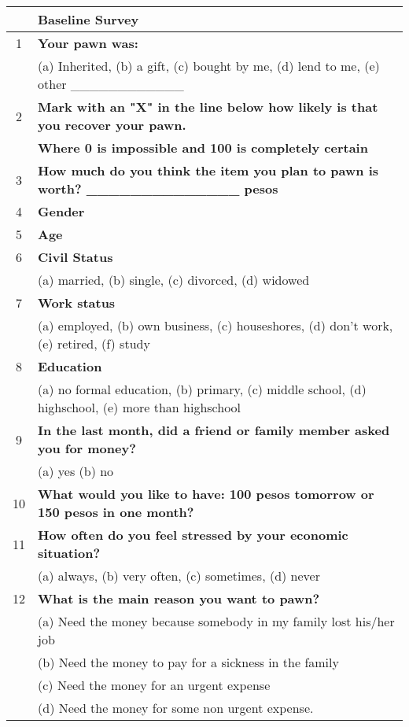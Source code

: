 \begin{tabular}{cl}
\toprule
      & \textbf{Baseline Survey} \\
\midrule
\midrule
1     & \textbf{Your pawn was:} \\
      & (a) Inherited, (b) a gift, (c) bought by me, (d) lend to me, (e) other \_\_\_\_\_\_\_\_\_\_\_\_ \\
2     & \textbf{Mark with an "X" in the line below how likely is that you recover your pawn. } \\
      & \textbf{Where 0 is impossible and 100 is completely certain} \\
3     & \textbf{How much do you think the item you plan to pawn is worth?       \_\_\_\_\_\_\_\_\_\_\_\_\_\_ pesos} \\
4     & \textbf{Gender      } \\
5     & \textbf{Age} \\
6     & \textbf{Civil Status } \\
      & (a) married, (b) single, (c) divorced, (d) widowed \\
7     & \textbf{Work status} \\
      & (a) employed, (b) own business, (c) houseshores, (d) don't work, (e) retired, (f) study \\
8     & \textbf{Education} \\
      & (a) no formal education, (b) primary, (c) middle school, (d) highschool, (e) more than highschool \\
9     & \textbf{In the last month, did a friend or family member asked you for money?} \\
      & (a) yes  (b) no \\
10    & \textbf{What would you like to have: 100 pesos tomorrow or 150 pesos in one month?} \\
11    & \textbf{How often do you feel stressed by your economic situation?} \\
      & (a) always, (b) very often, (c) sometimes, (d) never \\
12    & \textbf{What is the main reason you want to pawn?} \\
      & (a) Need the money because somebody in my family lost his/her job \\
      & (b) Need the money to pay for a sickness in the family \\
      & (c) Need the money for an urgent expense \\
      & (d) Need the money for some non urgent expense. \\

\end{tabular}

